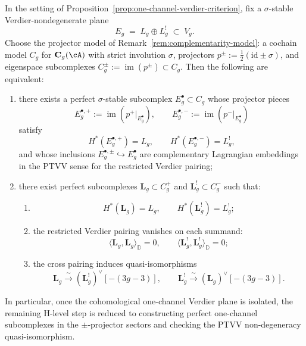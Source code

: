 \begin{proposition}\label{prop:one-channel-ptvv-criterion}
In the setting of
Proposition~\textup{\ref{prop:one-channel-verdier-criterion}}, fix a
$\sigma$-stable Verdier-nondegenerate plane
\[
E_g \;=\; L_g \oplus L_g^! \;\subset\; V_g.
\]
Choose the projector model of
Remark~\textup{\ref{rem:complementarity-model}}: a cochain model
$C_g$ for $\mathbf{C}_g(\cA)$ with strict involution $\sigma$,
projectors $p^\pm := \tfrac12(\mathrm{id}\pm\sigma)$, and eigenspace
subcomplexes $C_g^\pm := \operatorname{im}(p^\pm) \subset C_g$.
Then the following are equivalent:
\begin{enumerate}[label=\textup{(\roman*)}]
\item there exists a perfect $\sigma$-stable subcomplex
  $E_g^\bullet \subset C_g$ whose projector pieces
  \[
  E_g^{\bullet,+} := \operatorname{im}(p^+|_{E_g^\bullet}),
  \qquad
  E_g^{\bullet,-} := \operatorname{im}(p^-|_{E_g^\bullet})
  \]
  satisfy
  \[
  H^*(E_g^{\bullet,+}) = L_g,
  \qquad
  H^*(E_g^{\bullet,-}) = L_g^!,
  \]
  and whose inclusions
  $E_g^{\bullet,\pm} \hookrightarrow E_g^\bullet$
  are complementary Lagrangian embeddings in the PTVV sense for the
  restricted Verdier pairing;
\item there exist perfect subcomplexes
  $\mathbf{L}_g \subset C_g^+$ and
  $\mathbf{L}_g^! \subset C_g^-$ such that:
  \begin{enumerate}[label=\textup{(\alph*)}]
  \item
    \[
    H^*(\mathbf{L}_g) = L_g,
    \qquad
    H^*(\mathbf{L}_g^!) = L_g^!;
    \]
  \item the restricted Verdier pairing vanishes on each summand:
    \[
    \langle \mathbf{L}_g,\mathbf{L}_g\rangle_{\mathbb{D}} = 0,
    \qquad
    \langle \mathbf{L}_g^!,\mathbf{L}_g^!\rangle_{\mathbb{D}} = 0;
    \]
  \item the cross pairing induces quasi-isomorphisms
    \[
    \mathbf{L}_g
    \xrightarrow{\;\sim\;}
    (\mathbf{L}_g^!)^\vee[-(3g{-}3)],
    \qquad
    \mathbf{L}_g^!
    \xrightarrow{\;\sim\;}
    (\mathbf{L}_g)^\vee[-(3g{-}3)].
    \]
  \end{enumerate}
\end{enumerate}
In particular, once the cohomological one-channel Verdier plane is
isolated, the remaining H-level step is reduced to constructing
perfect one-channel subcomplexes in the $\pm$-projector sectors and
checking the PTVV non-degeneracy quasi-isomorphism.
\end{proposition}

